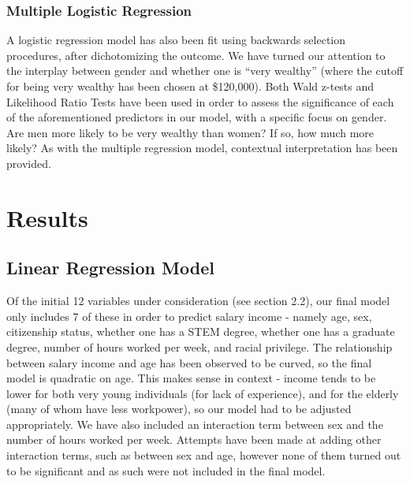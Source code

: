 \documentclass{article}
\begin{document}
\subsubsection{Multiple Logistic Regression}

A logistic regression model has also been fit using backwards selection procedures, after dichotomizing the outcome. We have turned our attention to the interplay between gender and whether one is ``very wealthy'' (where the cutoff for being very wealthy has been chosen at \$120,000). Both Wald z-tests and Likelihood Ratio Tests have been used in order to assess the significance of each of the aforementioned predictors in our model, with a specific focus on gender. Are men more likely to be very wealthy than women? If so, how much more likely? As with the multiple regression model, contextual interpretation has been provided.

\section{Results}

\subsection{Linear Regression Model}

Of the initial 12 variables under consideration (see section 2.2), our final model only includes 7 of these in order to predict salary income - namely age, sex, citizenship status, whether one has a STEM degree, whether one has a graduate degree, number of hours worked per week, and racial privilege. The relationship between salary income and age has been observed to be curved, so the final model is quadratic on age. This makes sense in context - income tends to be lower for both very young individuals (for lack of experience), and for the elderly (many of whom have less workpower), so our model had to be adjusted appropriately. We have also included an interaction term between sex and the number of hours worked per week. Attempts have been made at adding other interaction terms, such as between sex and age, however none of them turned out to be significant and as such were not included in the final model.
\end{document}

